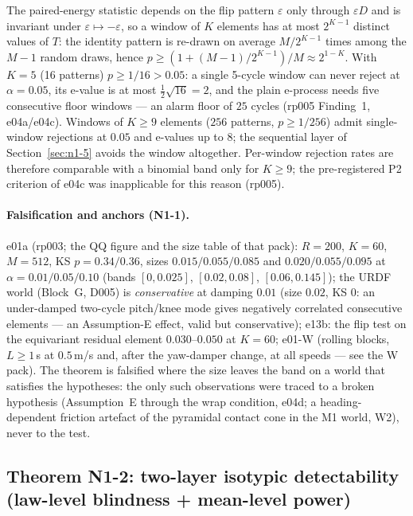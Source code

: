\begin{remark}
\label{rem:discrete}
The paired-energy statistic depends on the flip pattern $\varepsilon$ only
through $\varepsilon D$ and is invariant under $\varepsilon \mapsto
-\varepsilon$, so a window of $K$ elements has at most $2^{K-1}$ distinct
values of $T$: the identity pattern is re-drawn on average $M/2^{K-1}$ times
among the $M-1$ random draws, hence $p \ge (1 + (M-1)/2^{K-1})/M \approx
2^{1-K}$. With $K = 5$ (16 patterns) $p \ge 1/16 > 0.05$: a single 5-cycle
window can never reject at $\alpha = 0.05$, its e-value is at most $\tfrac12
\sqrt{16} = 2$, and the plain e-process needs five consecutive floor windows
--- an alarm floor of $25$ cycles (rp005 Finding~1, e04a/e04c). Windows of
$K \ge 9$ elements ($256$ patterns, $p \ge 1/256$) admit single-window
rejections at $0.05$ and e-values up to $8$; the sequential layer of
Section~\ref{sec:n1-5} avoids the window altogether. Per-window rejection
rates are therefore comparable with a binomial band only for $K \ge 9$;
the pre-registered P2 criterion of e04c was inapplicable for this reason
(rp005).
\end{remark}

\paragraph{Falsification and anchors (N1-1).}
e01a (rp003; the QQ figure and the size table of that pack): $R = 200$, $K = 60$, $M = 512$, KS $p = 0.34/0.36$, sizes $0.015/0.055/0.085$
and $0.020/0.055/0.095$ at $\alpha = 0.01/0.05/0.10$ (bands $[0, 0.025]$,
$[0.02, 0.08]$, $[0.06, 0.145]$); the URDF world (Block~G, D005) is
\emph{conservative} at damping $0.01$ (size $0.02$, KS $0$: an under-damped
two-cycle pitch/knee mode gives negatively correlated consecutive
elements --- an Assumption-E effect, valid but conservative); e13b: the flip
test on the equivariant residual element $0.030$--$0.050$ at $K = 60$; e01-W
(rolling blocks, $L \ge 1$\,s at $0.5$\,m/s and, after the yaw-damper change,
at all speeds --- see the W pack). The theorem is falsified where the size
leaves the band on a world that satisfies the hypotheses: the only such
observations were traced to a broken hypothesis (Assumption~E through the
wrap condition, e04d; a heading-dependent friction artefact of the pyramidal
contact cone in the M1 world, W2), never to the test.

\subsection{Theorem N1-2: two-layer isotypic detectability (law-level blindness + mean-level power)}
\label{sec:n1-2}


